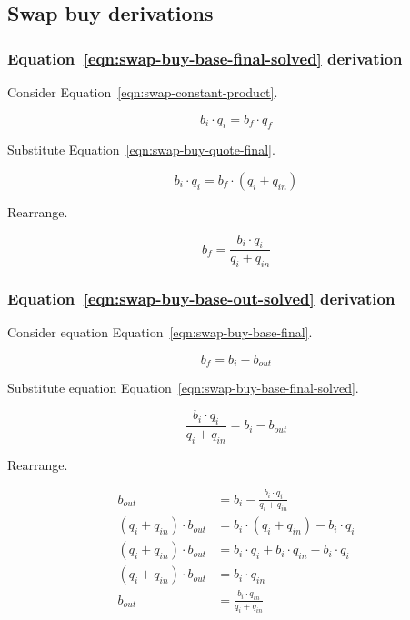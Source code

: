 \documentclass[table, twocolumn]{article}
\begin{document}
\subsection{Swap buy derivations}\label{ssec:swap-buy-derivations}

\subsubsection{Equation~\ref{eqn:swap-buy-base-final-solved} derivation}%
\label{sssec:equation-eqn-swap-buy-base-final-solved-derivation}

Consider Equation~\ref{eqn:swap-constant-product}.

\begin{equation}
	b_i \cdot q_i = b_f \cdot q_f \nonumber
\end{equation}

Substitute Equation~\ref{eqn:swap-buy-quote-final}.

\begin{equation}
	b_i \cdot q_i = b_f \cdot (q_i + q_{in}) \nonumber
\end{equation}

Rearrange.

\begin{equation}
	b_f = \frac{b_i \cdot q_i}{q_i + q_{in}} \nonumber
\end{equation}

\subsubsection{Equation~\ref{eqn:swap-buy-base-out-solved} derivation}%
\label{sssec:equation-eqn-swap-buy-base-out-solved-derivation}

Consider equation Equation~\ref{eqn:swap-buy-base-final}.

\begin{equation}
	b_f = b_i - b_{out} \nonumber
\end{equation}

Substitute equation Equation~\ref{eqn:swap-buy-base-final-solved}.

\begin{equation}
	\frac{b_i \cdot q_i}{q_i + q_{in}} = b_i - b_{out} \nonumber
\end{equation}

Rearrange.

\begin{align}
	b_{out}                      & = b_i - \frac{b_i \cdot q_i}{q_i + q_{in}} \nonumber \\
	(q_i + q_{in}) \cdot b_{out} & = b_i \cdot (q_i + q_{in})- b_i \cdot q_i \nonumber  \\
	(q_i + q_{in}) \cdot b_{out} & =
	b_i \cdot q_i + b_i \cdot q_{in} - b_i \cdot q_i \nonumber                          \\
	(q_i + q_{in}) \cdot b_{out} & = b_i \cdot q_{in} \nonumber                         \\
	b_{out}                      & = \frac{b_i \cdot q_{in}}{q_i + q_{in}} \nonumber
\end{align}
\end{document}
